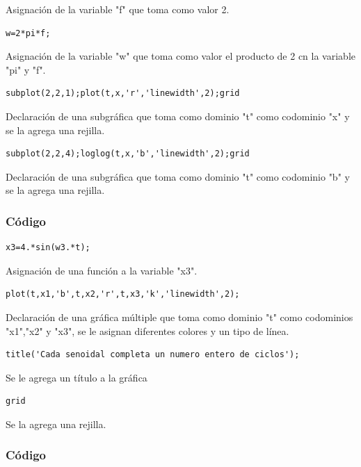 \documentclass[]{article}
\begin{document}
   Asignación de la variable "f" que toma como valor 2.\\

  \begin{verbatim}
w=2*pi*f;
\end{verbatim}

 Asignación de la variable "w" que toma como valor el producto de 2 cn la variable "pi" y "f".\\

  \begin{verbatim}
subplot(2,2,1);plot(t,x,'r','linewidth',2);grid
\end{verbatim}

Declaración de una subgráfica que toma como dominio "t" como codominio "x" y se la agrega una rejilla.\\

  \begin{verbatim}
subplot(2,2,4);loglog(t,x,'b','linewidth',2);grid
\end{verbatim}

Declaración de una subgráfica que toma como dominio "t" como codominio "b" y se la agrega una rejilla.\\

\subsubsection{Código}

\begin{verbatim}
x3=4.*sin(w3.*t);
\end{verbatim}
Asignación de una función a la variable "x3".\\

\begin{verbatim}
plot(t,x1,'b',t,x2,'r',t,x3,'k','linewidth',2);
\end{verbatim}
Declaración de una gráfica múltiple que toma como dominio "t" como codominios "x1","x2" y "x3", se le asignan diferentes colores y un tipo de línea.\\


\begin{verbatim}
title('Cada senoidal completa un numero entero de ciclos');
\end{verbatim}
Se le agrega un título a la gráfica

\begin{verbatim}
grid
\end{verbatim}
Se la agrega una rejilla.

\subsubsection{Código}
\end{document}
